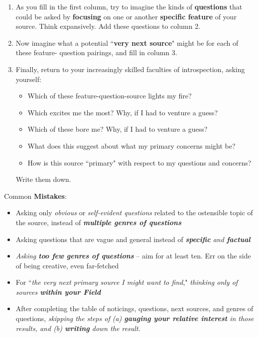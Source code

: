 \documentclass[11pt]{article}
\begin{document}
\begin{itemize}
\begin{exercise}
\begin{enumerate}
\item As you fill in the first column, try to imagine the kinds of \textbf{questions} that could be asked by \textbf{focusing} on one or another \textbf{specific feature} of your source.   Think expansively. Add these questions to column 2.

\item Now imagine what a potential ``\textbf{very next source}" might be for each of these feature- question pairings, and fill in column 3.

\item Finally, return to your increasingly skilled faculties of introspection, asking yourself:
\begin{itemize}
\item Which of these feature-question-source lights my fire?
\item Which excites me the most? Why, if I had to venture a guess?
\item Which of these bore me? Why, if I had to venture a guess?
\item What does this suggest about what my primary concerns might be?
\item How is this source ``primary" with respect to my questions and concerns?
\end{itemize} Write them down.
\end{enumerate}
\end{exercise}
Common \textbf{Mistakes}:
\begin{itemize}
\item Asking only \emph{obvious} or \emph{self-evident questions} related to the ostensible topic of the source, instead of \emph{\textbf{multiple genres of questions}}

\item Asking questions that are vague and general instead of \emph{\textbf{specific} and \textbf{factual}}

\item \emph{Asking \textbf{too few genres of questions}} -- aim for at least ten. Err on the side of being creative, even far-fetched

\item For ``\emph{the very next primary source I might want to find}," \emph{thinking only of sources \textbf{within your Field}}

\item After completing the table of noticings, questions, next sources, and genres of questions, \emph{skipping the steps of (a) \textbf{gauging your relative interest} in those results, and (b) \textbf{writing} down the result.}
\end{itemize}


\end{itemize}
\end{document}
